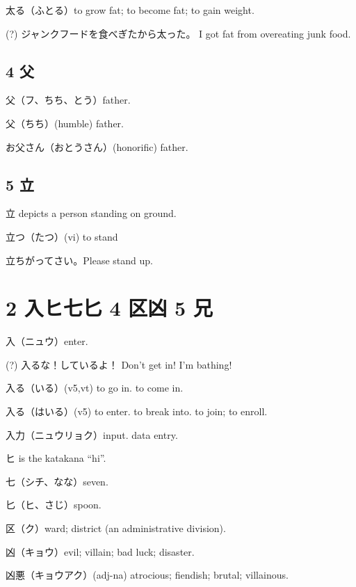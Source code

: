 太る（ふとる）to grow fat; to become fat; to gain weight.

(?) ジャンクフードを食べぎたから太った。
I got fat from overeating junk food.

\subsection{4 父}

父（フ、ちち、とう）father.

父（ちち）(humble) father.

お父さん（おとうさん）(honorific) father.



\subsection{5 立}

立 depicts a person standing on ground.

立つ（たつ）(vi) to stand

立ちがってさい。Please stand up.

\section{2 入ヒ七匕 4 区凶 5 兄}

入（ニュウ）enter.

(?) 入るな！しているよ！
Don't get in! I'm bathing!

入る（いる）(v5,vt)
to go in.
to come in.

入る（はいる）(v5)
to enter.
to break into.
to join; to enroll.

入力（ニュウリョク）input. data entry.

ヒ is the katakana ``hi''.

七（シチ、なな）seven.

匕（ヒ、さじ）spoon.

区（ク）ward; district (an administrative division).

凶（キョウ）evil; villain; bad luck; disaster.

凶悪（キョウアク）(adj-na) atrocious; fiendish; brutal; villainous.


